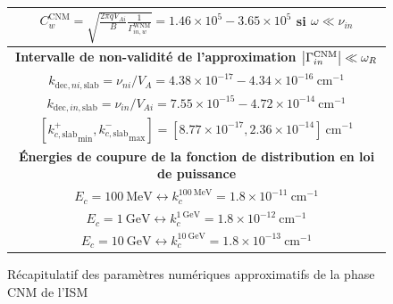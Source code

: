 \documentclass[10pt,a4paper]{article}
\begin{document}
\begin{figure}[h]
\begin{tabular}{|c|}
$C^\mathrm{CNM}_w = \sqrt{\frac{2\pi qV_{Ai}}{B} \frac{1}{\Gamma^\mathrm{WNM}_{in,w}}} = 1.46\times 10^5 - 3.65 \times 10^5$ si $\omega \ll \nu_{in}$ \\ 
\hline 
\hline
\bf{Intervalle de non-validité de l'approximation $\abs{\Gamma^\mathrm{CNM}_{in}} \ll \omega_R$} \\ 
\hline
$k_{\mathrm{dec},ni,\mathrm{slab}} = \nu_{ni}/V_A = 4.38\times 10^{-17} - 4.34 \times 10^{-16} ~ \mathrm{cm}^{-1}$ \\ 
$k_{\mathrm{dec},in,\mathrm{slab}} = \nu_{in}/V_{Ai} = 7.55\times 10^{-15} - 4.72 \times 10^{-14} ~ \mathrm{cm}^{-1}$ \\ 
$\left[{k^+_{c,\mathrm{slab}}}_\mathrm{min}, {k^-_{c,\mathrm{slab}}}_\mathrm{max} \right] = [8.77 \times 10^{-17}, 2.36\times 10^{-14}] ~ \mathrm{cm}^{-1}$ \\ 
\hline
\hline
\bf{Énergies de coupure de la fonction de distribution en loi de puissance} \\ 
\hline
$E_c = 100~\mathrm{MeV} \leftrightarrow k^{100~\mathrm{MeV}}_c = 1.8\times 10^{-11}~\mathrm{cm}^{-1}$ \\ 
$E_c = 1~\mathrm{GeV} \leftrightarrow k^{1~\mathrm{GeV}}_c = 1.8\times 10^{-12}~\mathrm{cm}^{-1}$     \\ 
$E_c = 10~\mathrm{GeV} \leftrightarrow k^{10~\mathrm{GeV}}_c = 1.8\times 10^{-13}~\mathrm{cm}^{-1}$   \\ 
\hline

\end{tabular}
\caption{Récapitulatif des paramètres numériques approximatifs de la phase CNM de l'ISM} 
\label{param_CNM}
\end{figure}
\end{document}
